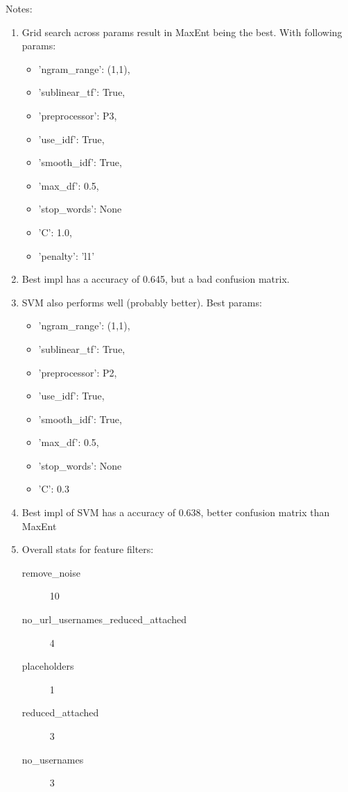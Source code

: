 Notes:
\begin{enumerate}
\item Grid search across params result in MaxEnt being the best. With following params:
	\begin{itemize}
		\item 'ngram\_range': (1,1),
		\item  'sublinear\_tf': True,
		\item  'preprocessor': P3,
		\item  'use\_idf': True,
		\item  'smooth\_idf': True,
		\item  'max\_df': 0.5,
		\item  'stop\_words': None
	\end{itemize}
	\begin{itemize}
		\item 'C': 1.0,
		\item 'penalty': 'l1'
	\end{itemize}
	
\item Best impl has a accuracy of 0.645, but a bad confusion matrix.

\item SVM also performs well (probably better). Best params:
	\begin{itemize}
		\item 'ngram\_range': (1,1),
		\item  'sublinear\_tf': True,
		\item  'preprocessor': P2,
		\item  'use\_idf': True,
		\item  'smooth\_idf': True,
		\item  'max\_df': 0.5,
		\item  'stop\_words': None
	\end{itemize}
	\begin{itemize}
		\item 'C': 0.3
	\end{itemize}

\item Best impl of SVM has a accuracy of 0.638, better confusion matrix than MaxEnt

\item Overall stats for feature filters:
	\begin{description}
		\item[remove\_noise] 10
		\item[no\_url\_usernames\_reduced\_attached] 4
		\item[placeholders] 1
		\item[reduced\_attached] 3
		\item[no\_usernames] 3
	\end{description}


\end{enumerate}
